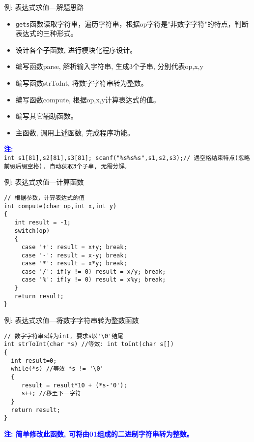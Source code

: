 \begin{frame}{例: 表达式求值---解题思路}
\begin{itemize}
	\item \lstinline|gets|函数读取字符串，遍历字符串，根据op字符是"非数字字符"的特点，判断表达式的三种形式。\\
	\item 设计各个子函数, 进行模块化程序设计。
	\item 编写函数parse, 解析输入字符串, 生成3个子串, 分别代表op,x,y
	\item 编写函数strToInt, 将数字字符串转为整数。
	\item 编写函数compute, 根据op,x,y计算表达式的值。
	\item 编写其它辅助函数。
	\item 主函数, 调用上述函数, 完成程序功能。
\end{itemize}
\textbf{\textcolor{blue}{注:}}\\
	 \lstinline|int s1[81],s2[81],s3[81]; scanf("%s%s%s",s1,s2,s3);// 遇空格结束特点(忽略前缀后缀空格), 自动获取3个子串, 无需分解。|
\end{frame}

\begin{frame}{例: 表达式求值---计算函数}
\begin{lstlisting}
// 根据参数，计算表达式的值 
int compute(char op,int x,int y)
{
   int result = -1;
   switch(op)
   {
     case '+': result = x+y; break;
     case '-': result = x-y; break;
     case '*': result = x*y; break;
     case '/': if(y != 0) result = x/y; break;
     case '%': if(y != 0) result = x%y; break;
   }
   return result;
}
\end{lstlisting}
\end{frame}

\begin{frame}{例: 表达式求值---将数字字符串转为整数函数}
\begin{lstlisting}
// 数字字符串s转为int, 要求s以'\0'结尾 
int strToInt(char *s) //等效: int toInt(char s[]) 
{
  int result=0;
  while(*s) //等效 *s != '\0'
  {
     result = result*10 + (*s-'0');
     s++; //移至下一字符 
  }
  return result;
} 
\end{lstlisting}
\textbf{\textcolor{blue}{注: 简单修改此函数, 可将由01组成的二进制字符串转为整数。}}
\end{frame}

